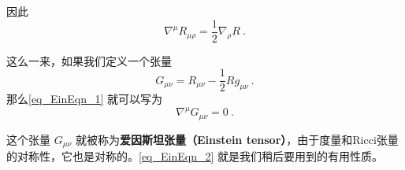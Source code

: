 因此
\begin{equation}\label{eq_EinEqn_1}
\nabla^\mu R_{\mu\rho}=\frac{1}{2}\nabla_\rho R~.
\end{equation}



这么一来，如果我们定义一个张量
\begin{equation}
G_{\mu\nu}=R_{\mu\nu}-\frac{1}{2}Rg_{\mu\nu}~.
\end{equation}
那么\autoref{eq_EinEqn_1} 就可以写为
\begin{equation}\label{eq_EinEqn_2}
\nabla^\mu G_{\mu\nu}=0~.
\end{equation}

这个张量 $G_{\mu\nu}$ 就被称为\textbf{爱因斯坦张量（Einstein tensor）}，由于度量和Ricci张量的对称性，它也是对称的。\autoref{eq_EinEqn_2} 就是我们稍后要用到的有用性质。









